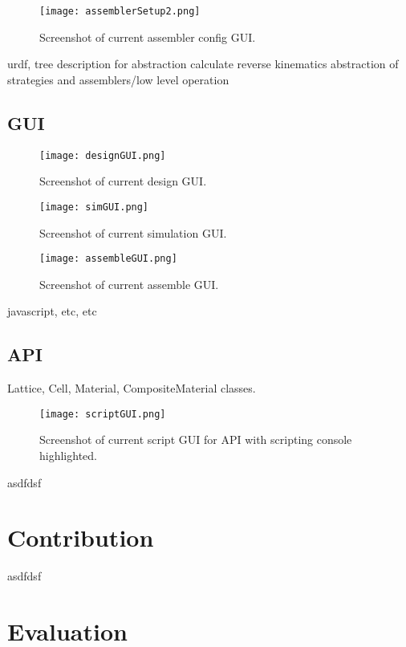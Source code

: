 \begin{figure}
  \texttt{[image: assemblerSetup2.png]}
  \caption{Screenshot of current assembler config GUI.}
  \label{fig: assembleSetup2}
\end{figure}

urdf, tree description for abstraction
calculate reverse kinematics
abstraction of strategies and assemblers/low level operation

\subsection{GUI}

\begin{figure}
  \texttt{[image: designGUI.png]}
  \caption{Screenshot of current design GUI.}
  \label{fig: designGUI}
\end{figure}

\begin{figure}
  \texttt{[image: simGUI.png]}
  \caption{Screenshot of current simulation GUI.}
  \label{fig: simGUI}
\end{figure}

\begin{figure}
  \texttt{[image: assembleGUI.png]}
  \caption{Screenshot of current assemble GUI.}
  \label{fig: assembleGUI}
\end{figure}

javascript, etc, etc

\subsection{API}

Lattice, Cell, Material, CompositeMaterial classes.

\begin{figure}
  \texttt{[image: scriptGUI.png]}
  \caption{Screenshot of current script GUI for API with scripting console highlighted.}
  \label{fig: scriptGUI}
\end{figure}

asdfdsf

\section{Contribution}

asdfdsf

\section{Evaluation}


